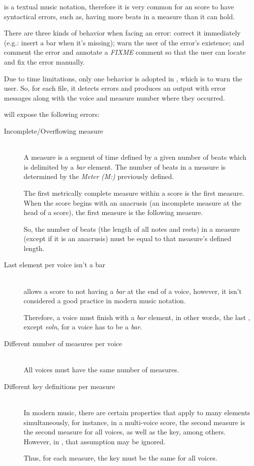 \abc{} is a textual music notation, therefore it is very common for an \abc{} score to have
syntactical errors, such as, having more beats in a measure than it can hold.

There are three kinds of behavior when facing an error: correct it immediately (e.g.: insert a bar
when it's missing); warn the user of the error's existence; and comment the error and annotate a
\emph{FIXME} comment so that the user can locate and fix the error manually.

Due to time limitations, only one behavior is adopted in \detecterrorsabc{}, which is to warn the
user. So, for each file, it detects errors and produces an output with error messages along with the
voice and measure number where they occurred.

\detecterrorsabc{} will expose the following errors:

\begin{description}
  \item[Incomplete/Overflowing measure] \hfill \\
    A measure is a segment of time defined by a given number of beats which is delimited by a
    \emph{bar} element. The number of beats in a measure is determined by the \emph{Meter (M:)}
    previously defined.

    The first metrically complete measure within a score is the first measure. When the score begins
    with an anacrusis (an incomplete measure at the head of a score), the first measure is the
    following measure.

    So, the number of beats (the length of all notes and rests) in a measure (except if it is an
    anacrusis) must be equal to that measure's defined length.

  \item[Last \abc{} element per voice isn't a bar] \hfill \\
    \abc{} allows a score to not having a \emph{bar} at the end of a voice, however, it isn't
    considered a good practice in modern music notation.

    Therefore, a voice must finish with a \emph{bar} element, in other words, the last
    \abcelement{}, except \emph{eoln}, for a voice has to be a \emph{bar}.

  \item[Different number of measures per voice] \hfill \\
    All voices must have the same number of measures.

  \item[Different key definitions per measure] \hfill \\
    In modern music, there are certain properties that apply to many elements simultaneously, for
    instance, in a multi-voice score, the second measure is the second measure for all voices, as
    well as the key, among others. However, in \abc{}, that assumption may be ignored.

    Thus, for each measure, the key must be the same for all voices.

\end{description}

